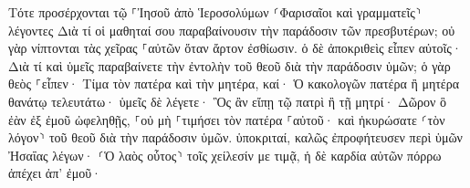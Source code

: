 \documentclass{openreader}
\begin{document}
Τότε προσέρχονται τῷ ⸀Ἰησοῦ ἀπὸ Ἱεροσολύμων ⸂Φαρισαῖοι καὶ γραμματεῖς⸃ λέγοντες 
Διὰ τί οἱ μαθηταί σου παραβαίνουσιν τὴν παράδοσιν τῶν πρεσβυτέρων; οὐ γὰρ νίπτονται τὰς χεῖρας ⸀αὐτῶν ὅταν ἄρτον ἐσθίωσιν. 
ὁ δὲ ἀποκριθεὶς εἶπεν αὐτοῖς· Διὰ τί καὶ ὑμεῖς παραβαίνετε τὴν ἐντολὴν τοῦ θεοῦ διὰ τὴν παράδοσιν ὑμῶν; 
ὁ γὰρ θεὸς ⸀εἶπεν· Τίμα τὸν πατέρα καὶ τὴν μητέρα, καί· Ὁ κακολογῶν πατέρα ἢ μητέρα θανάτῳ τελευτάτω· 
ὑμεῖς δὲ λέγετε· Ὃς ἂν εἴπῃ τῷ πατρὶ ἢ τῇ μητρί· Δῶρον ὃ ἐὰν ἐξ ἐμοῦ ὠφεληθῇς, 
⸀οὐ μὴ ⸀τιμήσει τὸν πατέρα ⸀αὐτοῦ· καὶ ἠκυρώσατε ⸂τὸν λόγον⸃ τοῦ θεοῦ διὰ τὴν παράδοσιν ὑμῶν. 
ὑποκριταί, καλῶς ἐπροφήτευσεν περὶ ὑμῶν Ἠσαΐας λέγων· 
⸂Ὁ λαὸς οὗτος⸃ τοῖς χείλεσίν με τιμᾷ, ἡ δὲ καρδία αὐτῶν πόρρω ἀπέχει ἀπ’ ἐμοῦ· 
\end{document}
